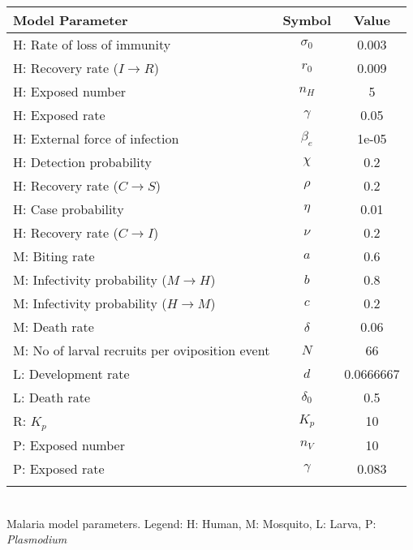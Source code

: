 \begin{table}
\noindent
\begin{tabular}{lcc}
{\bf Model Parameter} & {\bf Symbol} & {\bf Value}\\
\hline\hline
  H: Rate of loss of immunity & $\sigma_0$ & 0.003\\
  H: Recovery rate ($I \rightarrow R$) & $r_0$ & 0.009\\
  H: Exposed number & $n_H$ & 5\\
  H: Exposed rate & $\gamma$ & 0.05\\
  H: External force of infection & $\beta_e$ & 1e-05\\
  H: Detection probability & $\chi$ & 0.2\\
  H: Recovery rate ($C \rightarrow S$) & $\rho$ & 0.2\\
  H: Case probability & $\eta$ & 0.01\\
  H: Recovery rate ($C \rightarrow I$) & $\nu$ & 0.2\\
  M: Biting rate & $a$ & 0.6\\
  M: Infectivity probability ($M \rightarrow H$) & $b$ & 0.8\\
  M: Infectivity probability ($H \rightarrow M$) & $c$ & 0.2\\
  M: Death rate & $\delta$ & 0.06\\
  M: No of larval recruits per oviposition event & $N$ & 66\\
  L: Development rate & $d$ & 0.0666667\\
  L: Death rate & $\delta_0$ & 0.5\\
  R: $K_p$ & $K_p$ & 10\\
  P: Exposed number & $n_V$ & 10\\
  P: Exposed rate & $\gamma$ & 0.083\\
\hline\hline
\smallskip
\end{tabular}\\
 Malaria model parameters. Legend: {\small H: Human, M: Mosquito, L: Larva, P: {\em Plasmodium}}
\end{table}
